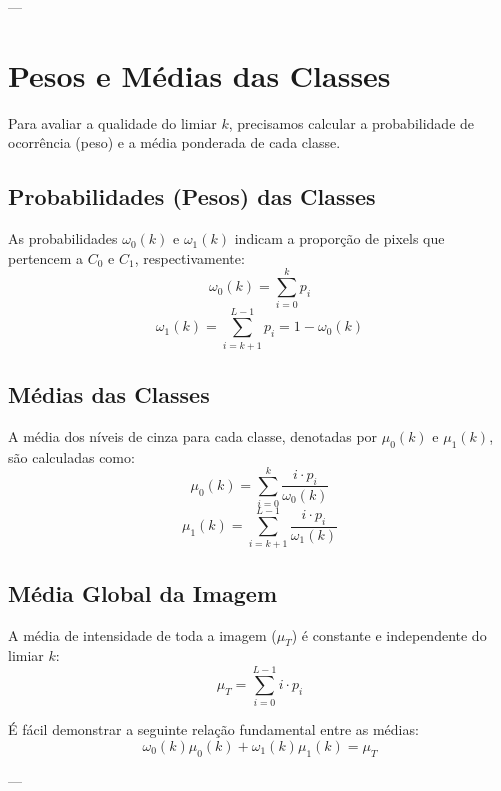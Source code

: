 \documentclass[12pt, a4paper]{article}
\begin{document}
---

\section{Pesos e Médias das Classes}

Para avaliar a qualidade do limiar $k$, precisamos calcular a probabilidade de ocorrência (peso) e a média ponderada de cada classe.

\subsection{Probabilidades (Pesos) das Classes}
As probabilidades $\omega_0(k)$ e $\omega_1(k)$ indicam a proporção de pixels que pertencem a $C_0$ e $C_1$, respectivamente:
\begin{equation}
    \omega_0(k) = \sum_{i=0}^{k} p_i
\end{equation}
\begin{equation}
    \omega_1(k) = \sum_{i=k+1}^{L-1} p_i = 1 - \omega_0(k)
\end{equation}

\subsection{Médias das Classes}
A média dos níveis de cinza para cada classe, denotadas por $\mu_0(k)$ e $\mu_1(k)$, são calculadas como:
\begin{equation}
    \mu_0(k) = \sum_{i=0}^{k} \frac{i \cdot p_i}{\omega_0(k)}
\end{equation}
\begin{equation}
    \mu_1(k) = \sum_{i=k+1}^{L-1} \frac{i \cdot p_i}{\omega_1(k)}
\end{equation}

\subsection{Média Global da Imagem}
A média de intensidade de toda a imagem ($\mu_T$) é constante e independente do limiar $k$:
\begin{equation}
    \mu_T = \sum_{i=0}^{L-1} i \cdot p_i
\end{equation}

É fácil demonstrar a seguinte relação fundamental entre as médias:
\begin{equation}
    \omega_0(k)\mu_0(k) + \omega_1(k)\mu_1(k) = \mu_T
\end{equation}

---
\end{document}
